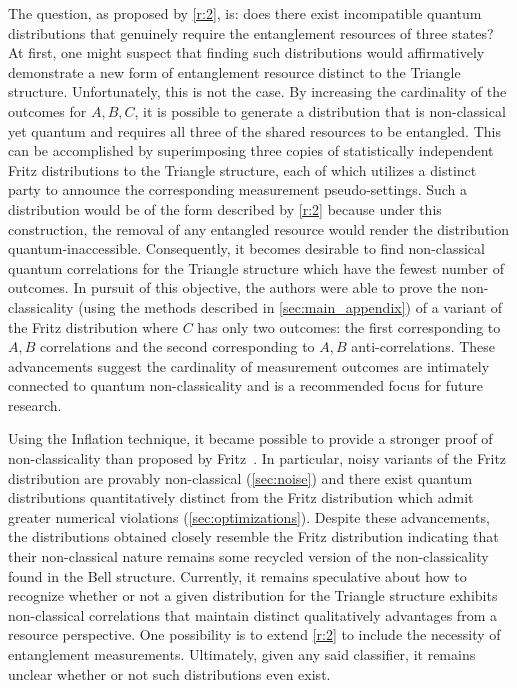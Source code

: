 \documentclass[aps, 10pt, english, twoside, pra, nofootinbib, tightenlines, longbibliography, superscriptaddress]{revtex4-1}
\begin{document}
    The question, as proposed by \ref{r:2}, is: does there exist incompatible quantum distributions that genuinely require the entanglement resources of three states? At first, one might suspect that finding such distributions would affirmatively demonstrate a new form of entanglement resource distinct to the Triangle structure. Unfortunately, this is not the case. By increasing the cardinality of the outcomes for $A, B, C$, it is possible to generate a distribution that is non-classical yet quantum and requires all three of the shared resources to be entangled. This can be accomplished by superimposing three copies of statistically independent Fritz distributions to the Triangle structure, each of which utilizes a distinct party to announce the corresponding measurement pseudo-settings. Such a distribution would be of the form described by \ref{r:2} because under this construction, the removal of any entangled resource would render the distribution quantum-inaccessible. Consequently, it becomes desirable to find non-classical quantum correlations for the Triangle structure which have the fewest number of outcomes. In pursuit of this objective, the authors were able to prove the non-classicality (using the methods described in \cref{sec:main_appendix}) of a variant of the Fritz distribution where $C$ has only two outcomes: the first corresponding to $A, B$ correlations and the second corresponding to $A, B$ anti-correlations. These advancements suggest the cardinality of measurement outcomes are intimately connected to quantum non-classicality and is a recommended focus for future research.

    Using the Inflation technique, it became possible to provide a stronger proof of non-classicality than proposed by Fritz~\cite{Fritz_2012}. In particular, noisy variants of the Fritz distribution are provably non-classical (\cref{sec:noise}) and there exist quantum distributions quantitatively distinct from the Fritz distribution which admit greater numerical violations (\cref{sec:optimizations}). Despite these advancements, the distributions obtained closely resemble the Fritz distribution indicating that their non-classical nature remains some recycled version of the non-classicality found in the Bell structure. Currently, it remains speculative about how to recognize whether or not a given distribution for the Triangle structure exhibits non-classical correlations that maintain distinct qualitatively advantages from a resource perspective. One possibility is to extend \cref{r:2} to include the necessity of entanglement measurements. Ultimately, given any said classifier, it remains unclear whether or not such distributions even exist.
\end{document}
